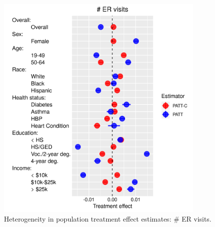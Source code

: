 \documentclass[hidelinks,12pt]{article}
\begin{document}
{\begin{appendices}
\begin{figure}[htbp]
	\begin{center}
		\includegraphics[width = 0.9\textwidth]{num-visit-plot}
		\caption{Heterogeneity in population treatment effect estimates: $\#$ ER visits.\label{fig:num-visit-plot}}
	\end{center}
\end{figure}


\end{appendices}}
\end{document}

